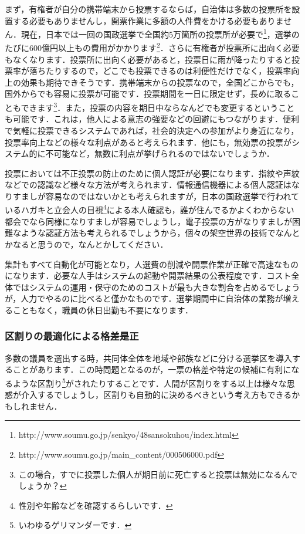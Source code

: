 まず，有権者が自分の携帯端末から投票するならば，自治体は多数の投票所を設置する必要もありませんし，開票作業に多額の人件費をかける必要もありません．現在，日本では一回の国政選挙で全国約5万箇所の投票所が必要で\footnote{http://www.soumu.go.jp/senkyo/48sansokuhou/index.html}，選挙のたびに600億円以上もの費用がかかります\footnote{http://www.soumu.go.jp/main\_content/000506000.pdf}．さらに有権者が投票所に出向く必要もなくなります．投票所に出向く必要があると，投票日に雨が降ったりすると投票率が落ちたりするので，どこでも投票できるのは利便性だけでなく，投票率向上の効果も期待できそうです．携帯端末からの投票なので，全国どこからでも，国外からでも容易に投票が可能です．投票期間を一日に限定せず，長めに取ることもできます\footnote{この場合，すでに投票した個人が期日前に死亡すると投票は無効になるんでしょうか？}．また，投票の内容を期日中ならなんどでも変更するということも可能です．これは，他人による意志の強要などの回避にもつながります．便利で気軽に投票できるシステムであれば，社会的決定への参加がより身近になり，投票率向上などの様々な利点があると考えられます．他にも，無効票の投票がシステム的に不可能など，無数に利点が挙げられるのではないでしょうか．

投票においては不正投票の防止のために個人認証が必要になります．指紋や声紋などでの認識など様々な方法が考えられます．情報通信機器による個人認証はなりすましが容易なのではないかとも考えられますが，日本の国政選挙で行われているハガキと立会人の目視\footnote{性別や年齢などを確認するらしいです．}による本人確認も，誰が住んでるかよくわからない都会でなら同様になりすましが容易でしょうし，電子投票の方がなりすましが困難なような認証方法も考えられるでしょうから，個々の架空世界の技術でなんとかなると思うので，なんとかしてください．

集計もすべて自動化が可能となり，人選費の削減や開票作業が正確で高速なものになります．必要な人手はシステムの起動や開票結果の公表程度です．コスト全体ではシステムの運用・保守のためのコストが最も大きな割合を占めるでしょうが，人力でやるのに比べると僅かなものです．選挙期間中に自治体の業務が増えることもなく，職員の休日出勤も不要になります．

\subsubsection*{区割りの最適化による格差是正}
多数の議員を選出する時，共同体全体を地域や部族などに分ける選挙区を導入することがあります．この時問題となるのが，一票の格差や特定の候補に有利になるような区割り\footnote{いわゆるゲリマンダーです．}がされたりすることです．人間が区割りをする以上は様々な思惑が介入するでしょうし，区割りも自動的に決めるべきという考え方もできるかもしれません．


